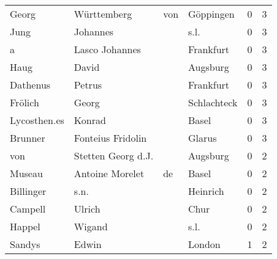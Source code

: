 \documentclass[10pt,a4paper,landscape]{article}
\begin{document}
\begin{longtable}{llllrr}
                    Georg &                        Württemberg &         von &                                   Göppingen &          0 &         3 \\
                     Jung &                           Johannes &             &                                        s.l. &          0 &         3 \\
                        a &                     Lasco Johannes &             &                                   Frankfurt &          0 &         3 \\
                     Haug &                              David &             &                                    Augsburg &          0 &         3 \\
                 Dathenus &                             Petrus &             &                                   Frankfurt &          0 &         3 \\
                  Frölich &                              Georg &             &                                 Schlachteck &          0 &         3 \\
             Lycosthen.es &                             Konrad &             &                                       Basel &          0 &         3 \\
                  Brunner &                  Fonteius Fridolin &             &                                      Glarus &          0 &         3 \\
                      von &                 Stetten Georg d.J. &             &                                    Augsburg &          0 &         2 \\
                   Museau &                    Antoine Morelet &          de &                                       Basel &          0 &         2 \\
                Billinger &                               s.n. &             &                                    Heinrich &          0 &         2 \\
                  Campell &                             Ulrich &             &                                        Chur &          0 &         2 \\
                   Happel &                             Wigand &             &                                        s.l. &          0 &         2 \\
                   Sandys &                              Edwin &             &                                      London &          1 &         2 \\

\end{longtable}
\end{document}
